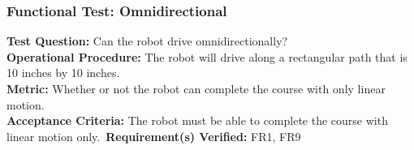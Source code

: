 \subsubsection{Functional Test: Omnidirectional}
\label{test:locomotion_ft_omni}
\textbf{Test Question:} Can the robot drive omnidirectionally? \\
\textbf{Operational Procedure:} The robot will drive along a rectangular path that is 10 inches by 10 inches.\\
\textbf{Metric:} Whether or not the robot can complete the course with only linear motion.\\
\textbf{Acceptance Criteria:} The robot must be able to complete the course with linear motion only.\
\textbf{Requirement(s) Verified:} FR1, FR9 \\
